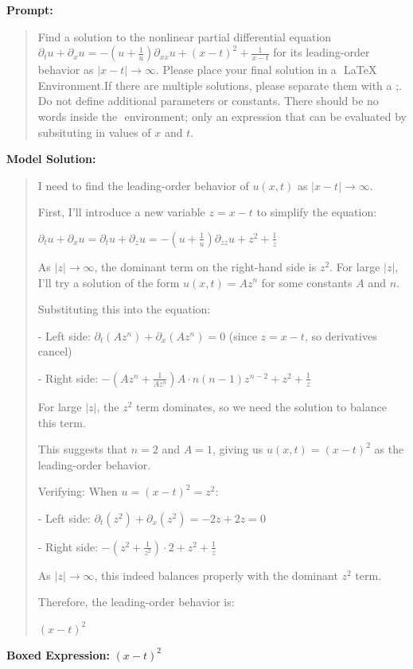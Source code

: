 \documentclass{article}
\begin{document}
\textbf{Prompt:}
\begin{quote}
Find a solution to the nonlinear partial differential equation $ \partial_t u + \partial_x u = -\left(u + \frac{1}{u}\right) \partial_{xx}u + (x-t)^2 + \frac{1}{x-t}$ for its leading-order behavior as $|x-t| \to \infty$. Please place your final solution in a $\boxed{}$ LaTeX Environment.If there are multiple solutions, please separate them with a ;. Do not define additional parameters or constants. There should be no words inside the $\boxed{}$ environment; only an expression that can be evaluated by subsituting in values of $x$ and $t$.
\end{quote}
\textbf{Model Solution:}
\begin{quote}
I need to find the leading-order behavior of $u(x,t)$ as $|x-t| \to \infty$.



First, I'll introduce a new variable $z = x-t$ to simplify the equation:

$\partial_t u + \partial_x u = \partial_t u + \partial_z u = -\left(u + \frac{1}{u}\right) \partial_{zz}u + z^2 + \frac{1}{z}$



As $|z| \to \infty$, the dominant term on the right-hand side is $z^2$. For large $|z|$, I'll try a solution of the form $u(x,t) = Az^n$ for some constants $A$ and $n$.



Substituting this into the equation:

- Left side: $\partial_t(Az^n) + \partial_x(Az^n) = 0$ (since $z = x-t$, so derivatives cancel)

- Right side: $-(Az^n + \frac{1}{Az^n})A\cdot n(n-1)z^{n-2} + z^2 + \frac{1}{z}$



For large $|z|$, the $z^2$ term dominates, so we need the solution to balance this term.



This suggests that $n = 2$ and $A = 1$, giving us $u(x,t) = (x-t)^2$ as the leading-order behavior.



Verifying: When $u = (x-t)^2 = z^2$:

- Left side: $\partial_t(z^2) + \partial_x(z^2) = -2z + 2z = 0$

- Right side: $-(z^2 + \frac{1}{z^2})·2 + z^2 + \frac{1}{z}$



As $|z| \to \infty$, this indeed balances properly with the dominant $z^2$ term.



Therefore, the leading-order behavior is:



$\boxed{(x-t)^2}$
\end{quote}
\textbf{Boxed Expression:} $(x-t)^2$
\end{document}
